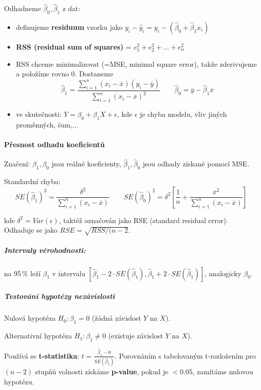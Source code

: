 \documentclass[11pt]{report} %
\numberwithin{equation}{section}
\begin{document}
Odhadneme $\hat{\beta}_0, \hat{\beta}_1$ z dat: 
\begin{itemize}
	\item definujeme \textbf{residuum} vzorku jako $y_i - \hat{y}_i = y_i - (\hat\beta_0 + \hat\beta_1x_i)$
	\item \textbf{RSS (residual sum of squares)} = $e_1^2 + e_2^2 + \dots + e_n^2$
	\item RSS chceme minimalizovat (=MSE, minimal square error), takže zderivujeme a položíme rovno 0. Dostaneme
	$$\hat\beta_1 = \frac{\sum_{i=1}^{n}(x_i-\overline{x})(y_i - \overline{y})}{\sum_{i=1}^{n}(x_i-\overline{x})^2}
	\qquad
	\hat\beta_0 = \overline{y} - \hat\beta_1\overline{x}$$
	\item ve skutečnosti: $Y =\beta_0 + \beta_1 X + \epsilon$, kde $\epsilon$ je chyba modelu, vliv jiných proměnných, šum,...	
\end{itemize}

\paragraph{Přesnost odhadu koeficientů}
Značení: $\beta_1, \beta_0$ jsou reálné koeficienty, $\hat{\beta}_1, \hat{\beta}_0$ jsou odhady získané pomocí MSE.

Standardní chyba:
$$
SE(\hat{\beta}_1)^2 = \frac{\delta^2}{\sum_{i=1}^{n}(x_i - \overline{x})}
\qquad
SE(\hat{\beta}_0)^2 = \delta^2 \left[\frac{1}{n} + \frac{\overline{x}^2}{\sum_{i=1}^{n}(x_i - \overline{x})} \right]$$

kde $\delta^2 = Var(\epsilon)$, taktéž označován jako RSE (standard residual error). Odhaduje se jako $RSE = \sqrt{RSS/(n-2}$.

\subparagraph{Intervaly věrohodnosti:} na 95\,\% leží $\beta_1$ v intervalu $[\hat{\beta}_1 - 2\cdot SE(\hat{\beta}_1), \hat{\beta}_1 + 2\cdot SE(\hat{\beta}_1)]$, analogicky $\beta_0$.

\subparagraph{Testování hypotézy nezávislosti}
Nulová hypotéza $H_0: \beta_1 = 0$ (žádná závislost $Y$ na $X$).

Alternativní hypotéza $H_1: \beta_1 \neq 0$ (existuje závislost $Y$ na $X$).

Používá se \textbf{t-statistika}: $t = \frac{\hat\beta_1 - 0}{SE(\hat\beta_1)}$. Porovnáním s tabelovaným t-rozložením pro $(n-2)$ stupňů volnosti získáme \textbf{p-value}, pokud je $< 0.05$, zamítáme nulovou hypotézu.
\end{document}
